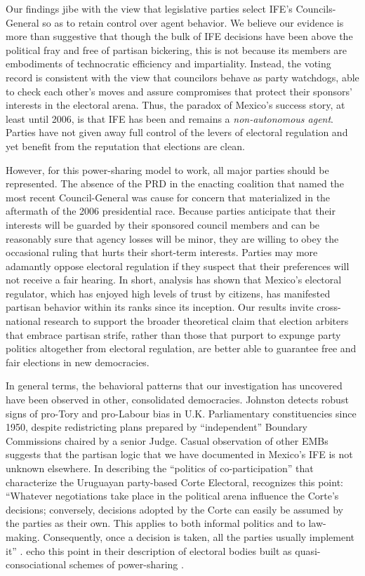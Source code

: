 \documentclass[12 pt, letter]{article}
\begin{document}
Our findings jibe with the view that legislative parties select
IFE's Councils-General so as to retain control over agent behavior.
We believe our evidence is more than suggestive that though the bulk
of IFE decisions have been above the political fray and free of
partisan bickering, this is not because its members are embodiments
of technocratic efficiency and impartiality.  Instead, the voting
record is consistent with the view that councilors behave as party
watchdogs, able to check each other's moves and assure compromises
that protect their sponsors' interests in the electoral arena. Thus,
the paradox of Mexico's success story, at least until 2006, is that
IFE has been and remains a \emph{non-autonomous agent}. Parties have
not given away full control of the levers of electoral regulation
and yet benefit from the reputation that elections are clean.

However, for this power-sharing model to work, all major parties
should be represented. The absence of the PRD in the enacting
coalition that named the most recent Council-General was cause for
concern that materialized in the aftermath of the 2006 presidential
race. Because parties anticipate that their interests will be
guarded by their sponsored council members and can be reasonably
sure that agency losses will be minor, they are willing to obey the
occasional ruling that hurts their short-term interests. Parties may
more adamantly oppose electoral regulation if they suspect that
their preferences will not receive a fair hearing. In short,
analysis has shown that Mexico's electoral regulator, which has
enjoyed high levels of trust by citizens, has manifested partisan
behavior within its ranks since its inception.   Our results invite
cross-national research to support the broader theoretical claim
that election arbiters that embrace partisan strife, rather than
those that purport to expunge party politics altogether from
electoral regulation, are better able to guarantee free and fair
elections in new democracies.

In general terms, the behavioral patterns that our investigation has
uncovered have been observed in other, consolidated democracies.
Johnston \citeyearpar{Johnston2002} detects robust signs of pro-Tory
and pro-Labour bias in U.K. Parliamentary constituencies since 1950,
despite redistricting plans prepared by ``independent'' Boundary
Commissions chaired by a senior Judge. Casual observation of other
EMBs suggests that the partisan logic that we have documented in
Mexico's IFE is not unknown elsewhere. In describing the ``politics
of co-participation'' that characterize the Uruguayan party-based
Corte Electoral, \citeauthor{LopezPintor2000} recognizes this point:
``Whatever negotiations take place in the political arena influence
the Corte's decisions; conversely, decisions adopted by the Corte
can easily be assumed by the parties as their own. This applies to
both informal politics and to law-making. Consequently, once a
decision is taken, all the parties usually implement it'' \citep[p.
23]{LopezPintor2000}. \citeauthor{Mozaffar2002a} echo this point in
their description of electoral bodies built as quasi-consociational
schemes of power-sharing \citep[p. 16]{Mozaffar2002a}.
\end{document}
